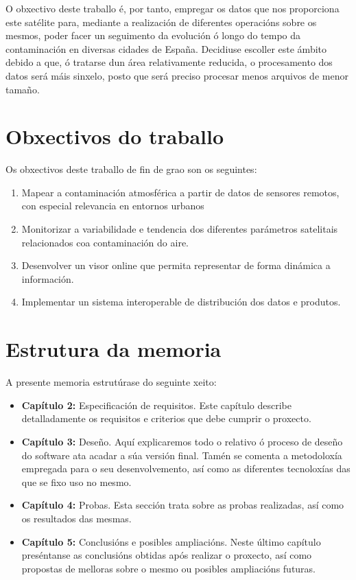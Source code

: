 O obxectivo deste traballo é, por tanto, empregar os datos que nos proporciona este satélite para, mediante a realización de diferentes operacións sobre
os mesmos, poder facer un seguimento da evolución ó longo do tempo da contaminación en diversas cidades de España. Decidiuse escoller este ámbito debido
a que, ó tratarse dun área relativamente reducida, o procesamento dos datos será máis sinxelo, posto que será preciso procesar menos arquivos de menor tamaño.


\section{Obxectivos do traballo}\label{obxectivos}
Os obxectivos deste traballo de fin de grao son os seguintes:
\begin{enumerate}
    \item Mapear a contaminación atmosférica a partir de datos de sensores remotos, con especial relevancia en entornos urbanos
    \item Monitorizar a variabilidade e tendencia dos diferentes parámetros satelitais relacionados coa contaminación do aire.
    \item Desenvolver un visor online que permita representar de forma dinámica a información.
    \item Implementar un sistema interoperable de distribución dos datos e produtos.
\end{enumerate}

\section{Estrutura da memoria}\label{estrutura}
A presente memoria estrutúrase do seguinte xeito:
\begin{itemize}
    \item \textbf{Capítulo 2:} Especificación de requisitos. Este capítulo describe detalladamente os requisitos e criterios que debe cumprir o proxecto.
    \item \textbf{Capítulo 3:} Deseño. Aquí explicaremos todo o relativo ó proceso de deseño do software ata acadar a súa versión final. Tamén se comenta a
    metodoloxía empregada para o seu desenvolvemento, así como as diferentes tecnoloxías das que se fixo uso no mesmo.
    \item \textbf{Capítulo 4:} Probas. Esta sección trata sobre as probas realizadas, así como os resultados das mesmas.
    \item \textbf{Capítulo 5:} Conclusións e posibles ampliacións. Neste último capítulo preséntanse as conclusións obtidas após realizar o proxecto,
    así como propostas de melloras sobre o mesmo ou posibles ampliacións futuras.
\end{itemize}


